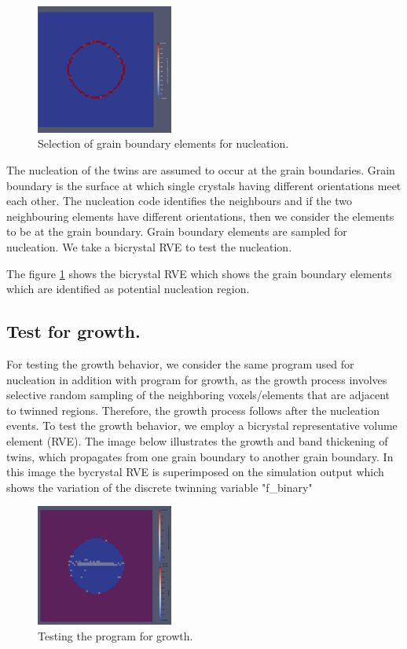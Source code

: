 \begin{figure}[H]
    \centering
    \includegraphics[width=0.4\textwidth]{images/Grain boundray identification test.png}
    \caption{Selection of grain boundary elements for nucleation.}
    \label{fig:Selection of grain boundary elements.}
\end{figure}

The nucleation of the twins are assumed to occur at the grain boundaries. Grain boundary is the surface at which single crystals having different orientations meet each other. The nucleation code identifies the neighbours and if the two neighbouring elements have different orientations, then we consider the elements to be at the grain boundary. Grain boundary elements are sampled for nucleation. We take a bicrystal RVE to test the nucleation.

The figure \ref{fig:Selection of grain boundary elements.} shows the bicrystal RVE which shows the grain boundary elements which are identified as potential nucleation region.

\subsection{Test for growth.}
For testing the growth behavior, we consider the same program used for nucleation in addition with program for growth, as the growth process involves selective random sampling of the neighboring voxels/elements that are adjacent to twinned regions. Therefore, the growth process follows after the nucleation events. To test the growth behavior, we employ a bicrystal representative volume element (RVE). The image below illustrates the growth and band thickening of twins, which propagates from one grain boundary to another grain boundary. In this image the bycrystal RVE is superimposed on the simulation output which shows the variation of the discrete twinning variable "f\_binary"

\begin{figure}[H]
    \centering
    \includegraphics[width=0.4\textwidth]{images/Growth.png}
    \caption{Testing the program for growth.}
    \label{fig:Selection of neighbour elements for growth.}
\end{figure}